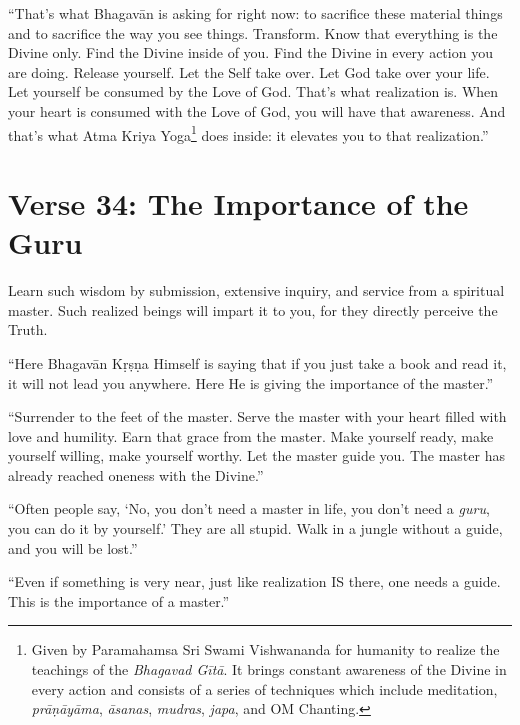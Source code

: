 \enquote{That’s what Bhagavān is asking for right now: to sacrifice these material things and to sacrifice the way you see things. Transform. Know that everything is the Divine only. Find the Divine inside of you. Find the Divine in every action you are doing. Release yourself. Let the Self take over. Let God take over your life. Let yourself be consumed by the Love of God. That’s what realization is. When your heart is consumed with the Love of God, you will have that awareness. And that’s what Atma Kriya Yoga\footnote{Given by Paramahamsa Sri Swami Vishwananda for humanity to realize the teachings of the \textit{Bhagavad Gītā}. It brings constant awareness of the Divine in every action and consists of a series of techniques which include meditation, \textit{prāṇāyāma}, \textit{āsanas}, \textit{mudras}, \textit{japa}, and OM Chanting.} does inside: it elevates you to that realization.}

\section{Verse 34: The Importance of the Guru}\label{sec-verse-34-the-importance-of-the-guru}
{Learn such wisdom by submission, extensive inquiry, and service from a spiritual master. Such realized beings will impart it to you, for they directly perceive the Truth.}

\enquote{Here Bhagavān Kṛṣṇa Himself is saying that if you just take a book and read it, it will not lead you anywhere. Here He is giving the importance of the master.}

\enquote{Surrender to the feet of the master. Serve the master with your heart filled with love and humility. Earn that grace from the master. Make yourself ready, make yourself willing, make yourself worthy. Let the master guide you. The master has already reached oneness with the Divine.}

\enquote{Often people say, \enquote{No, you don’t need a master in life, you don’t need a \textit{guru}, you can do it by yourself.} They are all stupid. Walk in a jungle without a guide, and you will be lost.}

\enquote{Even if something is very near, just like realization IS there, one needs a guide. This is the importance of a master.}


